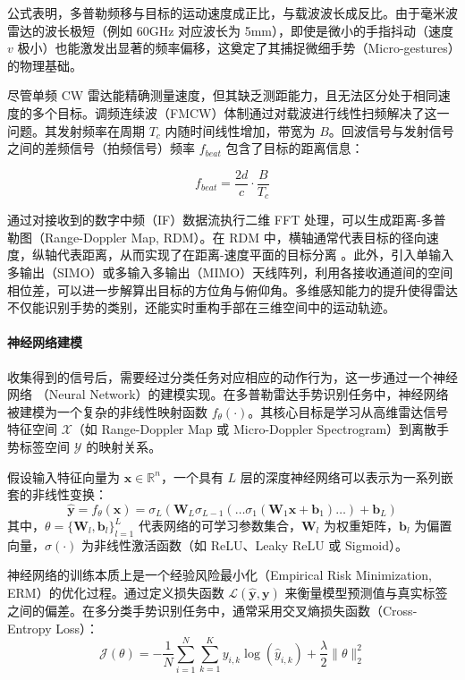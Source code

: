 公式表明，多普勒频移与目标的运动速度成正比，与载波波长成反比。由于毫米波雷达的波长极短（例如 60GHz 对应波长为 5mm），即使是微小的手指抖动（速度 $v$ 极小）也能激发出显著的频率偏移，这奠定了其捕捉微细手势（Micro-gestures）的物理基础。

尽管单频 CW 雷达能精确测量速度，但其缺乏测距能力，且无法区分处于相同速度的多个目标。调频连续波（FMCW）体制通过对载波进行线性扫频解决了这一问题。其发射频率在周期 $T_c$ 内随时间线性增加，带宽为 $B$。回波信号与发射信号之间的差频信号（拍频信号）频率 $f_{beat}$ 包含了目标的距离信息：


\begin{equation}
f_{beat} = \frac{2d}{c} \cdot \frac{B}{T_c}
\end{equation}

通过对接收到的数字中频（IF）数据流执行二维 FFT 处理，可以生成距离-多普勒图（Range-Doppler Map, RDM）。在 RDM 中，横轴通常代表目标的径向速度，纵轴代表距离，从而实现了在距离-速度平面的目标分离 。此外，引入单输入多输出（SIMO）或多输入多输出（MIMO）天线阵列，利用各接收通道间的空间相位差，可以进一步解算出目标的方位角与俯仰角。多维感知能力的提升使得雷达不仅能识别手势的类别，还能实时重构手部在三维空间中的运动轨迹。

\paragraph{神经网络建模}

收集得到的信号后，需要经过分类任务对应相应的动作行为，这一步通过一个神经网络 （Neural Network）的建模实现。在多普勒雷达手势识别任务中，神经网络被建模为一个复杂的非线性映射函数 $f_\theta(\cdot)$。其核心目标是学习从高维雷达信号特征空间 $\mathcal{X}$（如 Range-Doppler Map 或 Micro-Doppler Spectrogram）到离散手势标签空间 $\mathcal{Y}$ 的映射关系。

假设输入特征向量为 $\mathbf{x} \in \mathbb{R}^n$，一个具有 $L$ 层的深度神经网络可以表示为一系列嵌套的非线性变换：
\begin{equation}
    \hat{\mathbf{y}} = f_\theta(\mathbf{x}) = \sigma_L \left( \mathbf{W}_L \sigma_{L-1} \left( \dots \sigma_1 \left( \mathbf{W}_1 \mathbf{x} + \mathbf{b}_1 \right) \dots \right) + \mathbf{b}_L \right)
\end{equation}
其中，$\theta = \{\mathbf{W}_l, \mathbf{b}_l\}_{l=1}^L$ 代表网络的可学习参数集合，$\mathbf{W}_l$ 为权重矩阵，$\mathbf{b}_l$ 为偏置向量，$\sigma(\cdot)$ 为非线性激活函数（如 ReLU、Leaky ReLU 或 Sigmoid）。

神经网络的训练本质上是一个经验风险最小化（Empirical Risk Minimization, ERM）的优化过程。通过定义损失函数 $\mathcal{L}(\hat{\mathbf{y}}, \mathbf{y})$ 来衡量模型预测值与真实标签之间的偏差。在多分类手势识别任务中，通常采用交叉熵损失函数（Cross-Entropy Loss）：
\begin{equation}
    \mathcal{J}(\theta) = -\frac{1}{N} \sum_{i=1}^N \sum_{k=1}^K y_{i,k} \log(\hat{y}_{i,k}) + \frac{\lambda}{2} \|\theta\|^2_2
\end{equation}

